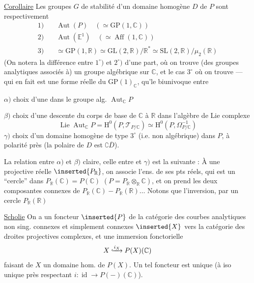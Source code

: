 \uline{Corollaire} Les groupes $G$ de stabilité d'un domaine homogène $D$ de $P$ sont respectivement
\[
\begin{aligned}
1)\quad&\operatorname{Aut}(P)\quad(\simeq\mathrm{GP}(1,\mathbb C))\\
2)\quad&\operatorname{Aut}(\mathbb E^1)\quad(\simeq\operatorname{Aff}(1,\mathbb C))\\
3)\quad&\simeq\mathrm{GP}(1,\mathbb R)\simeq\mathrm{GL}(2,\mathbb R)/\mathbb R^*\simeq\mathrm{SL}(2,\mathbb R)/\mu_2(\mathbb R)
\end{aligned}
\]
(On notera la différence entre $1^\circ)$ et $2^\circ)$ d'une part, où on trouve (des groupes analytiques associés à) un groupe algébrique sur $\mathbb C$, et le cas $3^\circ$
 où on trouve  --- qui en fait est une forme réelle du $\mathrm{GP}(1)_{\mathbb C}$,  qu'le   biunivoque entre

$\alpha)$ choix d'une  dans le groupe alg.  $\operatorname{Aut}_{\mathbb C}P$

$\beta)$ choix d'une descente du corps de base de $\mathbb C$ à $\mathbb R$ dans l'algèbre de Lie complexe
\[
\operatorname{Lie}\operatorname{Aut}_{\mathbb C}P=\mathrm H^0(P,\mathcal T_{P/\mathbb C})\simeq\mathrm H^0(P,\Omega^{-1}_{P/\mathbb C})
\]
$\gamma)$ choix d'un domaine homogène de type $3^\circ$ (i.e. non algébrique) dans $P$, à polarité près (la polaire de $D$ est $\complement\overline D$).

La relation entre $\alpha)$ et $\beta)$ claire, celle entre \unsure{$\delta)$|$\alpha)$} et $\gamma)$ est la suivante : À une  projective réelle $\inserted{P_{\mathbb R}}$, on associe l'ens. de ses pts réels, qui est un ``cercle'' dans $P_{\mathbb R}(\mathbb C)=P(\mathbb C)$ $(P=P_{\mathbb R}\otimes_{\mathbb R}\mathbb C)$, et on prend les deux composantes connexes de $P_{\mathbb R}(\mathbb C)-P_{\mathbb R}(\mathbb R)\ldots$ Notons que l'inversion, par un cercle $P_{\mathbb R}(\mathbb R)$

\uline{Scholie} On a un foncteur $\inserted{P}$ de la catégorie des courbes analytiques non sing. connexes et simplement connexes $\inserted{X}$ vers la catégorie des droites projectives complexes, et une immersion fonctorielle
\[X\lhook\joinrel\xrightarrow{i_X}P(X)(\mathbb C)\]
faisant de $X$ un domaine  hom. de $P(X)$.
Un tel foncteur est unique (à iso unique près respectant $i:\operatorname{id}\longrightarrow P(-)(\mathbb C)$).

